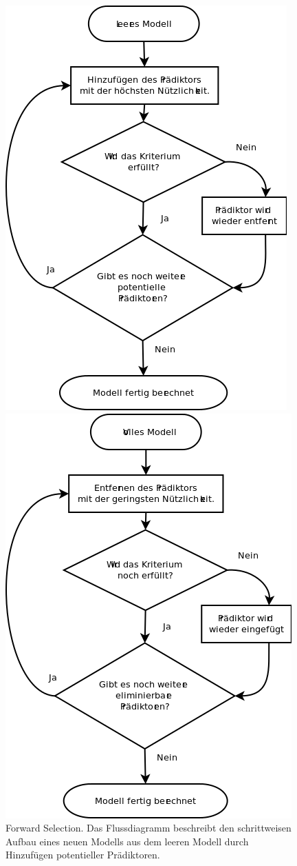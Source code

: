 \begin{figure}[htbp]
	\centering
	\includegraphics[height=0.5\textheight]{forward_stepwise.png}
	\caption{Forward Selection. Das Flussdiagramm beschreibt den schrittweisen Aufbau eines neuen Modells aus dem leeren Modell durch Hinzufügen potentieller Prädiktoren.}
	\label{fig:forward_stepwise}
	\includegraphics[height=0.5\textheight]{backward_stepwise.png}

\end{figure}
